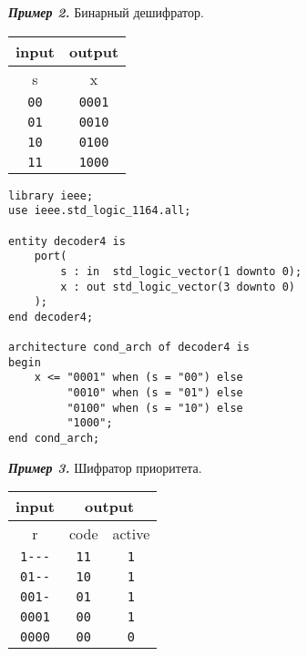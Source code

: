 \textbf{\textit{Пример 2.}} Бинарный дешифратор.

{
\centering
\begin{tabular}{|c|c|}
\hline
input       & output        \\ \hline
s           & x             \\ \hline
\texttt{00} & \texttt{0001} \\
\texttt{01} & \texttt{0010} \\
\texttt{10} & \texttt{0100} \\
\texttt{11} & \texttt{1000} \\
\hline
\end{tabular}\par
}

\begin{Code}
\begin{lstlisting}
library ieee;
use ieee.std_logic_1164.all;

entity decoder4 is
    port(
        s : in  std_logic_vector(1 downto 0);
        x : out std_logic_vector(3 downto 0)
    );
end decoder4;

architecture cond_arch of decoder4 is
begin
    x <= "0001" when (s = "00") else
         "0010" when (s = "01") else
         "0100" when (s = "10") else
         "1000";
end cond_arch;
\end{lstlisting}
\end{Code}

\textbf{\textit{Пример 3.}} Шифратор приоритета.

{
\centering
\begin{tabular}{|c|c|c|}
\hline
input               & \multicolumn{2}{|c|}{output} \\ \hline
r                   & code        & active         \\ \hline
\texttt{1{-}{-}{-}} & \texttt{11} & \texttt{1}     \\
\texttt{01{-}{-}}   & \texttt{10} & \texttt{1}     \\
\texttt{001-}       & \texttt{01} & \texttt{1}     \\
\texttt{0001}       & \texttt{00} & \texttt{1}     \\
\texttt{0000}       & \texttt{00} & \texttt{0}     \\
\hline
\end{tabular}\par
}

